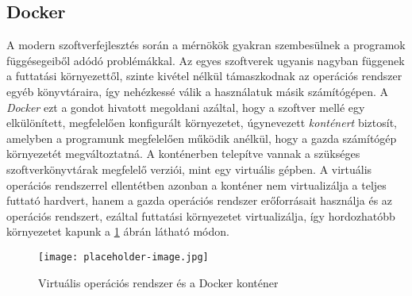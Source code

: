 \subsection{Docker} \label{subs:docker_bevezeto}

A modern szoftverfejlesztés során a mérnökök gyakran szembesülnek a programok függésegeiből adódó problémákkal. Az egyes szoftverek ugyanis nagyban függenek a futtatási környezettől, szinte kivétel nélkül támaszkodnak az operációs rendszer egyéb könyvtáraira, így nehézkessé válik a használatuk másik számítógépen. A \emph{Docker} ezt a gondot hivatott megoldani azáltal, hogy a szoftver mellé egy elkülönített, megfelelően konfigurált környezetet, úgynevezett \emph{konténert} biztosít, amelyben a programunk megfelelően működik anélkül, hogy a gazda számítógép környezetét megváltoztatná. A konténerben telepítve vannak a szükséges szoftverkönyvtárak megfelelő verziói, mint egy virtuális gépben. A virtuális operációs rendszerrel ellentétben azonban a konténer nem virtualizálja a teljes futtató hardvert, hanem a gazda operációs rendszer erőforrásait használja és az operációs rendszert, ezáltal futtatási környezetet virtualizálja, így hordozhatóbb környezetet kapunk a \ref{fig:placeholder_1} ábrán látható módon.

\begin{figure}[h]
\texttt{[image: placeholder-image.jpg]}
\centering
\caption{Virtuális operációs rendszer és a Docker konténer}
\label{fig:placeholder_1}
\end{figure}